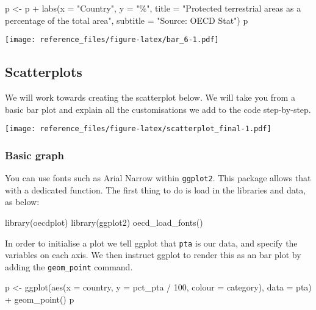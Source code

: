 \documentclass[
]{article}
\newenvironment{Shaded}{\begin{snugshade}}{\end{snugshade}}
\newcommand{\AttributeTok}[1]{\textcolor[rgb]{0.77,0.63,0.00}{#1}}
\newcommand{\DecValTok}[1]{\textcolor[rgb]{0.00,0.00,0.81}{#1}}
\newcommand{\FunctionTok}[1]{\textcolor[rgb]{0.00,0.00,0.00}{#1}}
\newcommand{\NormalTok}[1]{#1}
\newcommand{\OtherTok}[1]{\textcolor[rgb]{0.56,0.35,0.01}{#1}}
\newcommand{\SpecialCharTok}[1]{\textcolor[rgb]{0.00,0.00,0.00}{#1}}
\newcommand{\StringTok}[1]{\textcolor[rgb]{0.31,0.60,0.02}{#1}}
\begin{document}
\begin{Shaded}
\begin{Highlighting}[]
\NormalTok{p }\OtherTok{\textless{}{-}}\NormalTok{ p }\SpecialCharTok{+}
  \FunctionTok{labs}\NormalTok{(}\AttributeTok{x =} \StringTok{"Country"}\NormalTok{, }\AttributeTok{y =} \StringTok{"\%"}\NormalTok{,}
       \AttributeTok{title =} \StringTok{"Protected terrestrial areas as a percentage of the total area"}\NormalTok{,}
       \AttributeTok{subtitle =} \StringTok{"Source: OECD Stat"}\NormalTok{)}
\NormalTok{p}
\end{Highlighting}
\end{Shaded}

\texttt{[image: reference\_files/figure-latex/bar\_6-1.pdf]}

\hypertarget{scatterplots}{%
\subsection{Scatterplots}\label{scatterplots}}

We will work towards creating the scatterplot below. We will take you
from a basic bar plot and explain all the customisations we add to the
code step-by-step.

\texttt{[image: reference\_files/figure-latex/scatterplot\_final-1.pdf]}

\hypertarget{basic-graph-1}{%
\subsubsection{Basic graph}\label{basic-graph-1}}

You can use fonts such as Arial Narrow within \texttt{ggplot2}. This
package allows that with a dedicated function. The first thing to do is
load in the libraries and data, as below:

\begin{Shaded}
\begin{Highlighting}[]
\FunctionTok{library}\NormalTok{(oecdplot)}
\FunctionTok{library}\NormalTok{(ggplot2)}
\FunctionTok{oecd\_load\_fonts}\NormalTok{()}
\end{Highlighting}
\end{Shaded}

In order to initialise a plot we tell ggplot that \texttt{pta} is our
data, and specify the variables on each axis. We then instruct ggplot to
render this as an bar plot by adding the \texttt{geom\_point} command.

\begin{Shaded}
\begin{Highlighting}[]
\NormalTok{p }\OtherTok{\textless{}{-}} \FunctionTok{ggplot}\NormalTok{(}\FunctionTok{aes}\NormalTok{(}\AttributeTok{x =}\NormalTok{ country, }\AttributeTok{y =}\NormalTok{ pct\_pta }\SpecialCharTok{/} \DecValTok{100}\NormalTok{, }\AttributeTok{colour =}\NormalTok{ category), }\AttributeTok{data =}\NormalTok{ pta) }\SpecialCharTok{+}
  \FunctionTok{geom\_point}\NormalTok{()}
\NormalTok{p}
\end{Highlighting}
\end{Shaded}
\end{document}
